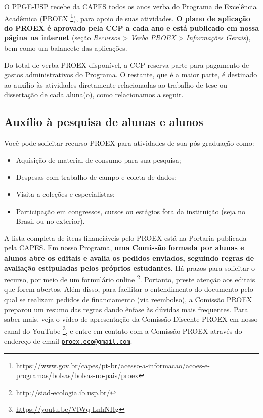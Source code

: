 O PPGE-USP recebe da CAPES todos os anos verba do Programa de
Excelência Acadêmica (PROEX
\footnote{\url{https://www.gov.br/capes/pt-br/acesso-a-informacao/acoes-e-programas/bolsas/bolsas-no-pais/proex}}),
para apoio de suas atividades. \textbf{O plano de aplicação do PROEX é
  aprovado pela CCP a cada ano e está publicado em nossa página na
  internet} (seção \emph{Recursos} \textgreater{} \emph{Verba PROEX} \textgreater{}
\emph{Informações Gerais}), bem como um balancete das aplicações.

Do total de verba PROEX disponível, a CCP reserva parte para pagamento
de %
gastos administrativos do Programa. O restante, que é a maior parte, é
destinado ao auxílio às atividades diretamente relacionadas ao
trabalho de tese ou dissertação de cada aluna(o), como relacionamos a
seguir.

\subsection{Auxílio à pesquisa de alunas e alunos
}\label{auxilio-pesquisa-de-alunas-e-alunos}

Você pode solicitar recurso PROEX para atividades de sua pós-graduação como:

\begin{itemize}
\item Aquisição de material de consumo para sua pesquisa;
\item Despesas com trabalho de campo e coleta de dados;
\item Visita a coleções e especialistas;
\item Participação em congressos, cursos ou estágios fora da
  instituição (seja no Brasil ou no exterior).
\end{itemize}

A lista completa de itens financiáveis pelo PROEX está na Portaria
publicada pela CAPES. Em nosso Programa, \textbf{uma Comissão formada
  por alunas e alunos abre os editais e avalia os pedidos enviados,
  seguindo regras de avaliação estipuladas pelos próprios
  estudantes}. Há prazos para solicitar o recurso, por meio de um
formulário online \footnote{\url{http://siad-ecologia.ib.usp.br/}}.
Portanto, preste atenção aos editais que forem abertos. Além disso,
para facilitar o entendimento do documento pelo qual se realizam
pedidos de financiamento (via reembolso), a Comissão PROEX preparou um
resumo das regras dando ênfase às dúvidas mais frequentes. Para saber
mais, veja o vídeo de apresentação da Comissão Discente PROEX em nosso
canal do YouTube \footnote{\url{https://youtu.be/VlWq-LnhNHg}}, e
entre em contato com a Comissão PROEX através do endereço de email
\href{mailto:proex.eco@gmail.com}{\nolinkurl{proex.eco@gmail.com}}.

